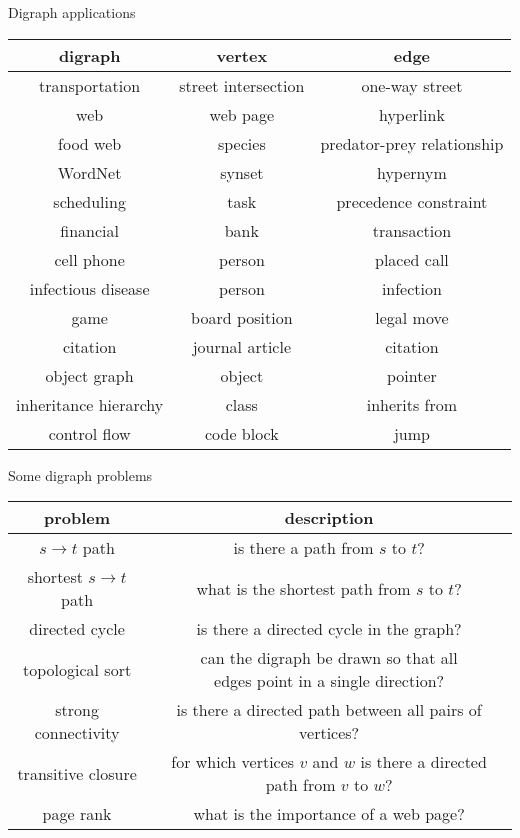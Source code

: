 \documentclass[8pt,a4paper,compress]{beamer}
\begin{document}
\begin{frame}[fragile]
\pause

Digraph applications
\begin{center}
\begin{tabular}{ccc}
digraph & vertex & edge \\ \hline
transportation & street intersection & one-way street \\
web & web page & hyperlink \\
food web & species & predator-prey relationship \\
WordNet & synset & hypernym \\
scheduling & task & precedence constraint \\
financial & bank & transaction \\
cell phone & person & placed call \\
infectious disease & person & infection \\
game & board position & legal move \\
citation & journal article & citation \\
object graph & object & pointer \\
inheritance hierarchy & class & inherits from \\ 
control flow & code block & jump
\end{tabular}  
\end{center}
\end{frame}

\begin{frame}[fragile]
\pause

Some digraph problems
\begin{center}
\begin{tabular}{cc}
problem & description \\ \hline
$s\to t$ path & is there a path from $s$ to $t$? \\ 
shortest $s\to t$ path & what is the shortest path from $s$ to $t$? \\
directed cycle & is there a directed cycle in the graph? \\
topological sort & \makecell{can the digraph be drawn so that all \\ edges point in a single direction?} \\
strong connectivity & is there a directed path between all pairs of vertices? \\
transitive closure & \makecell{for which vertices $v$ and $w$ is there a \\ directed path from $v$ to $w$?} \\
page rank & what is the importance of a web page?
\end{tabular}  
\end{center}
\end{frame}
\end{document}

